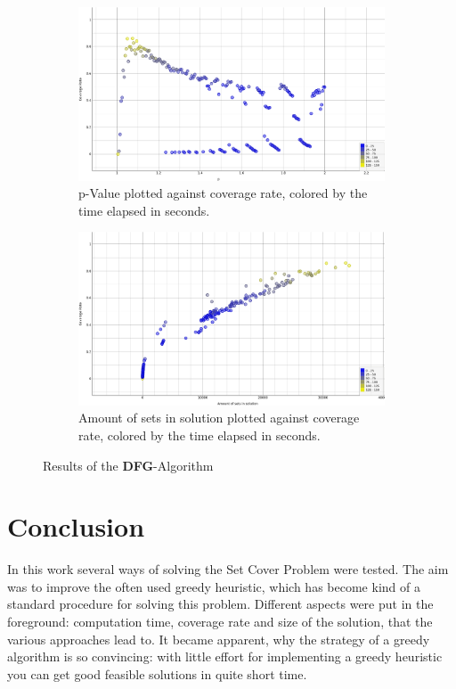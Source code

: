 \documentclass[a4paper]{article}
\begin{document}
\begin{figure}
\centering
\begin{subfigure}[b]{\textwidth}
   \includegraphics[width=1\linewidth]{dfg_p_crate_time.png}
   \caption{p-Value plotted against coverage rate, colored by the time elapsed in seconds.}
\end{subfigure}

\begin{subfigure}[b]{\textwidth}
   \includegraphics[width=1\linewidth]{dfg_amountsets_crate_time.png}
    \caption{ Amount of sets in solution plotted against coverage rate, colored by the time elapsed in seconds.}
\end{subfigure}
\caption{Results of the \textbf{DFG}-Algorithm}
\end{figure}

\pagebreak

\section{Conclusion}
In this work several ways of solving the Set Cover Problem were tested. The aim was to improve the often used greedy heuristic, which has become kind of a standard procedure for solving this problem. Different aspects were put in the foreground: computation time, coverage rate and size of the solution, that the various approaches lead to. It became apparent, why the strategy of a greedy algorithm is so convincing: with little effort for implementing a greedy heuristic you can get good feasible solutions in quite short time. 
\end{document}
